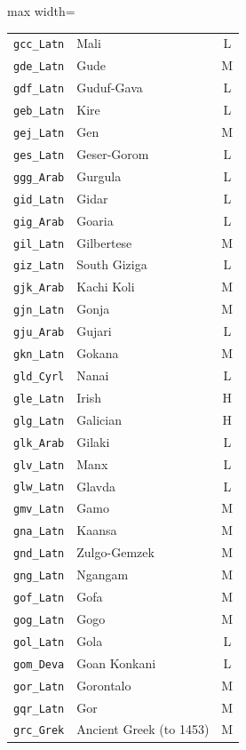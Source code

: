 {\begin{adjustbox}{max width=\textwidth}
\begin{tabular}{llc}
        \texttt{gcc\_Latn} & Mali & L \\
        \texttt{gde\_Latn} & Gude & M \\
        \texttt{gdf\_Latn} & Guduf-Gava & L \\
        \texttt{geb\_Latn} & Kire & L \\
        \texttt{gej\_Latn} & Gen & M \\
        \texttt{ges\_Latn} & Geser-Gorom & L \\
        \texttt{ggg\_Arab} & Gurgula & L \\
        \texttt{gid\_Latn} & Gidar & L \\
        \texttt{gig\_Arab} & Goaria & L \\
        \texttt{gil\_Latn} & Gilbertese & M \\
        \texttt{giz\_Latn} & South Giziga & L \\
        \texttt{gjk\_Arab} & Kachi Koli & M \\
        \texttt{gjn\_Latn} & Gonja & M \\
        \texttt{gju\_Arab} & Gujari & L \\
        \texttt{gkn\_Latn} & Gokana & M \\
        \texttt{gld\_Cyrl} & Nanai & L \\
        \texttt{gle\_Latn} & Irish & H \\
        \texttt{glg\_Latn} & Galician & H \\
        \texttt{glk\_Arab} & Gilaki & L \\
        \texttt{glv\_Latn} & Manx & L \\
        \texttt{glw\_Latn} & Glavda & L \\
        \texttt{gmv\_Latn} & Gamo & M \\
        \texttt{gna\_Latn} & Kaansa & M \\
        \texttt{gnd\_Latn} & Zulgo-Gemzek & M \\
        \texttt{gng\_Latn} & Ngangam & M \\
        \texttt{gof\_Latn} & Gofa & M \\
        \texttt{gog\_Latn} & Gogo & M \\
        \texttt{gol\_Latn} & Gola & L \\
        \texttt{gom\_Deva} & Goan Konkani & L \\
        \texttt{gor\_Latn} & Gorontalo & M \\
        \texttt{gqr\_Latn} & Gor & M \\
        \texttt{grc\_Grek} & Ancient Greek (to 1453) & M \\

\end{tabular}
\end{adjustbox}}
